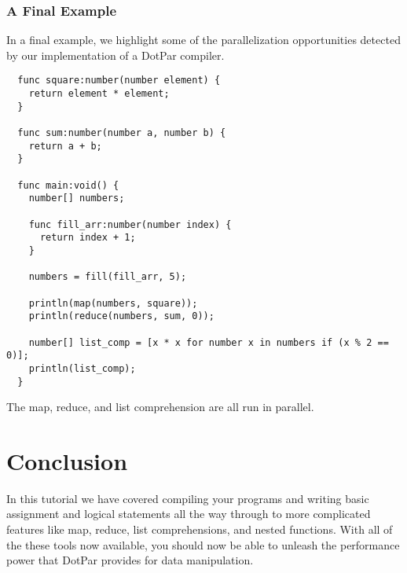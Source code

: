 \subsubsection{A Final Example}
In a final example, we highlight some of the parallelization opportunities
detected by our implementation of a DotPar compiler.

\begin{verbatim}
  func square:number(number element) {
    return element * element;
  }

  func sum:number(number a, number b) {
    return a + b;
  }

  func main:void() {
    number[] numbers;

    func fill_arr:number(number index) {
      return index + 1;
    }

    numbers = fill(fill_arr, 5);

    println(map(numbers, square));
    println(reduce(numbers, sum, 0));

    number[] list_comp = [x * x for number x in numbers if (x % 2 == 0)];
    println(list_comp);
  }
\end{verbatim}

The map, reduce, and list comprehension are all run in parallel.

\section{Conclusion}

In this tutorial we have covered compiling your programs and writing basic
assignment and logical statements all the way through to more complicated
features like map, reduce, list comprehensions, and nested functions. With all
of the these tools now available, you should now be able to unleash the
performance power that DotPar provides for data manipulation.

